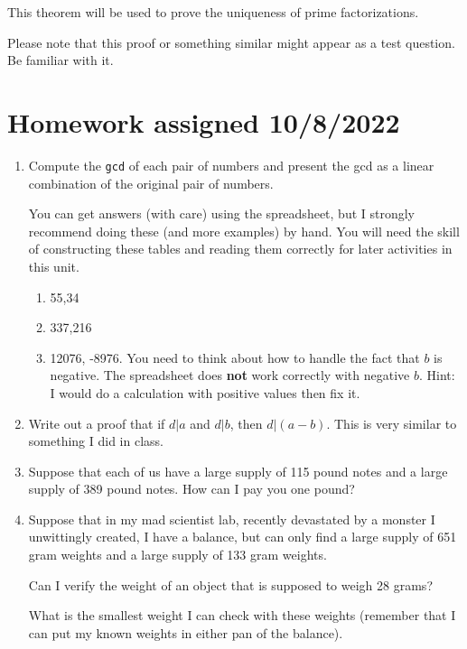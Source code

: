 \documentclass[12pt]{article}
\begin{document}
This theorem will be used to prove the uniqueness of prime factorizations.

Please note that this proof or something similar might appear as a test question.  Be familiar with it.

\section{Homework assigned 10/8/2022}

\begin{enumerate}

\item  Compute the {\tt gcd} of each pair  of numbers and present the gcd as a linear combination of the original pair of numbers.

You can get answers (with care) using the spreadsheet, but I strongly recommend doing these (and more examples) by hand.  You will need the skill of constructing these tables and reading them correctly for later activities in this unit.

\begin{enumerate}

\item  55,34

\item 337,216

\item 12076, -8976.  You need to think about how to handle the fact that $b$ is negative.  The spreadsheet does {\bf not} work correctly with negative $b$.  Hint:  I would do a calculation with positive values then fix it.

\end{enumerate}

\item  Write out a proof that if $d|a$ and $d|b$, then $d|(a-b)$.  This is very similar to something I did in class.

\item  Suppose that each of us have a large supply of 115 pound notes and a large supply of 389 pound notes.
How can I pay you one pound?

\item  Suppose that in my mad scientist lab, recently devastated by a monster I unwittingly created, I have a balance, but can only find a large supply of 651 gram weights and a large supply of 133 gram weights.

Can I verify the weight of an object that is supposed to weigh 28 grams?

What is the smallest weight I can check with these weights (remember that I can put my known weights in either pan of the balance).

\end{enumerate}
\end{document}
